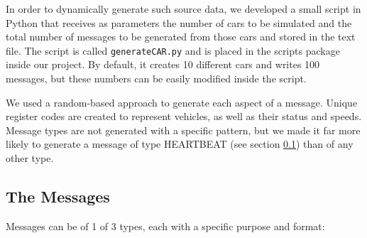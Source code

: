 \documentclass[12pt]{article}
\begin{document}
In order to dynamically generate such source data, we developed a small script in Python that receives as parameters the number of cars to be simulated and the 
total number of messages to be generated from those cars and stored in the text file.
The script is called \texttt{generateCAR.py} and is placed in the scripts package inside our project.
By default, it creates 10 different cars and writes 100 messages, but these numbers can be easily modified inside the script. 

We used a random-based approach to generate each aspect of a message.
Unique register codes are created to represent vehicles, as well as their status and speeds.
Message types are not generated with a specific pattern, but we made it far more likely to generate a message of type HEARTBEAT (see section \ref{messages}) 
than of any other type.


\subsection{The Messages} \label{messages} %

Messages can be of 1 of 3 types, each with a specific purpose and format:
\end{document}
